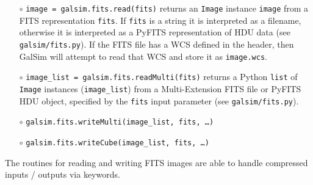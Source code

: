 \documentclass[preprint,11pt]{../../devel/modules/aastex}
\begin{document}
\begin{itemize}

\item[$\circ$] \texttt{image = galsim.fits.read(fits)} \newline
{returns an \texttt{Image} instance \texttt{image} from a FITS
  representation \texttt{fits}.  If \texttt{fits} is a string it is
  interpreted as a filename, otherwise it is interpreted as a PyFITS
  representation of HDU data (see
  \texttt{galsim/fits.py}). If the FITS file has a WCS defined in the header,
  then GalSim will attempt to read that WCS and store it as \texttt{image.wcs}.}
\item[$\circ$] \texttt{image\_list = galsim.fits.readMulti(fits)}
  \newline
{returns a Python \texttt{list} of \texttt{Image} instances (\texttt{image\_list}) from a
Multi-Extension FITS file or PyFITS HDU object, specified by the
\texttt{fits} input parameter (see \texttt{galsim/fits.py}).}
\item[$\circ$] \texttt{galsim.fits.writeMulti(image\_list, fits, \dots)}
\item[$\circ$] \texttt{galsim.fits.writeCube(image\_list, fits, \dots)}

\end{itemize}

The routines for reading and writing FITS images are able to handle
compressed inputs / outputs via keywords.
\end{document}
